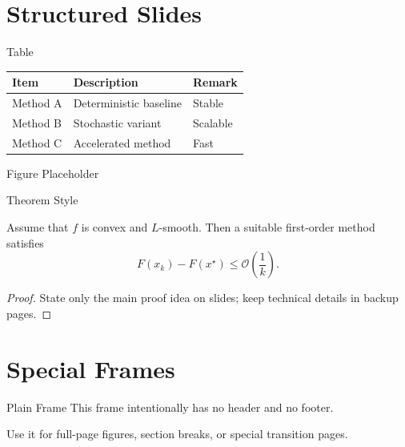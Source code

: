 \documentclass[aspectratio=169]{beamer}
\begin{document}
\section{Structured Slides}

\begin{frame}{Table}
\centering
\begin{tabularx}{0.78\textwidth}{@{}lYY@{}}
\toprule
Item & Description & Remark \\
\midrule
Method A & Deterministic baseline & Stable \\
Method B & Stochastic variant & Scalable \\
Method C & Accelerated method & Fast \\
\bottomrule
\end{tabularx}
\end{frame}

\begin{frame}{Figure Placeholder}
\centering
{}
\end{frame}

\begin{frame}{Theorem Style}
\begin{theorem}
Assume that $f$ is convex and $L$-smooth. Then a suitable first-order method satisfies
\[
  F(x_k)-F(x^\star) \le \mathcal{O}\left(\frac{1}{k}\right).
\]
\end{theorem}
\begin{proof}
State only the main proof idea on slides; keep technical details in backup pages.
\end{proof}
\end{frame}

\section{Special Frames}

\begin{frame}[plain]{Plain Frame}
\centering
This frame intentionally has no header and no footer.

\vspace{1em}
Use it for full-page figures, section breaks, or special transition pages.
\end{frame}
\end{document}

